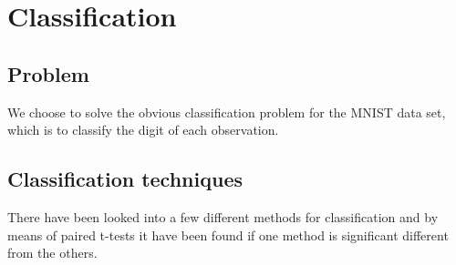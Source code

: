 \chapter{Classification}

\section{Problem}
We choose to solve the obvious classification problem for the MNIST data set, which is to classify the digit of each observation. 

\section{Classification techniques}
There have been looked into a few different methods for classification and by means of paired t-tests it have been found if one method is significant different from the others.

